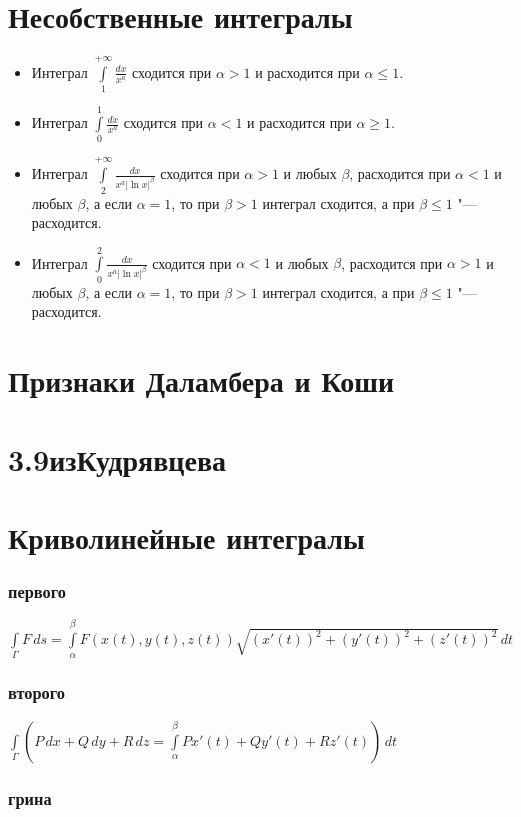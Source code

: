 \section{Несобственные интегралы}
\begin{itemize}
\item
Интеграл $\int\limits_{1}^{+\infty} \frac{dx}{x^a}$ сходится при $\alpha > 1$ и расходится при $\alpha \leq 1$.
\item 
Интеграл $\int\limits_{0}^{1} \frac{dx}{x^a}$ сходится при $\alpha < 1$ и расходится при $\alpha \geq 1$.
\item
Интеграл $\int\limits_{2}^{+\infty} \frac{dx}{x^a |\ln x|^{\beta}}$ сходится при $\alpha > 1$ и любых $\beta$, расходится при $\alpha < 1$ и любых $\beta$, а если $\alpha = 1$, то при $\beta > 1$ интеграл сходится, а при $\beta \leq 1$ "--- расходится.
\item 
Интеграл $\int\limits_{0}^{2} \frac{dx}{x^a |\ln x|^{\beta}}$ сходится при $\alpha < 1$ и любых $\beta$, расходится при $\alpha > 1$ и любых $\beta$, а если $\alpha = 1$, то при $\beta > 1$ интеграл сходится, а при $\beta \leq 1$ "--- расходится.
\end{itemize}

\section{Признаки Даламбера и Коши}

\section{3.9изКудрявцева}

\section{Криволинейные интегралы}
\subsubsection{первого}
$\int\limits_{\Gamma} F\, ds = \int\limits_{\alpha}^{\beta} F(x(t),y(t),z(t))\sqrt{(x'(t))^2+(y'(t))^2+(z'(t))^2}\,dt$
\subsubsection{второго}
$\int\limits_{\Gamma} \left(P\,dx+Q\,dy+R\,dz=\int\limits_{\alpha}^{\beta} P x'(t)+ Q y'(t)+ R z'(t)\right)\,dt$
\subsubsection{грина}


